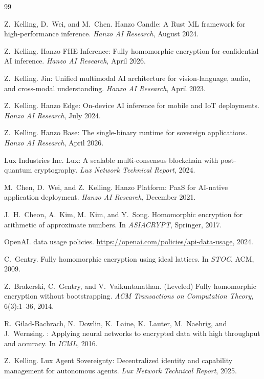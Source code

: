 \begin{thebibliography}{99}

Z.~Kelling, D.~Wei, and M.~Chen.
\newblock Hanzo Candle: A {Rust} {ML} framework for high-performance inference.
\newblock \emph{Hanzo AI Research}, August 2024.

Z.~Kelling.
\newblock Hanzo {FHE} Inference: Fully homomorphic encryption for confidential
{AI} inference.
\newblock \emph{Hanzo AI Research}, April 2026.

Z.~Kelling.
\newblock Jin: Unified multimodal {AI} architecture for vision-language, audio,
and cross-modal understanding.
\newblock \emph{Hanzo AI Research}, April 2023.

Z.~Kelling.
\newblock Hanzo Edge: On-device {AI} inference for mobile and {IoT} deployments.
\newblock \emph{Hanzo AI Research}, July 2024.

Z.~Kelling.
\newblock Hanzo Base: The single-binary runtime for sovereign applications.
\newblock \emph{Hanzo AI Research}, April 2026.

{Lux Industries Inc}.
\newblock Lux: A scalable multi-consensus blockchain with post-quantum
cryptography.
\newblock \emph{Lux Network Technical Report}, 2024.

M.~Chen, D.~Wei, and Z.~Kelling.
\newblock Hanzo Platform: {PaaS} for {AI}-native application deployment.
\newblock \emph{Hanzo AI Research}, December 2021.

J.~H.~Cheon, A.~Kim, M.~Kim, and Y.~Song.
\newblock Homomorphic encryption for arithmetic of approximate numbers.
\newblock In \emph{ASIACRYPT}, Springer, 2017.

{OpenAI}.
 data usage policies.
\newblock \url{https://openai.com/policies/api-data-usage}, 2024.

C.~Gentry.
\newblock Fully homomorphic encryption using ideal lattices.
\newblock In \emph{STOC}, ACM, 2009.

Z.~Brakerski, C.~Gentry, and V.~Vaikuntanathan.
\newblock ({Leveled}) Fully homomorphic encryption without bootstrapping.
\newblock \emph{ACM Transactions on Computation Theory}, 6(3):1--36, 2014.

R.~Gilad-Bachrach, N.~Dowlin, K.~Laine, K.~Lauter, M.~Naehrig, and
J.~Wernsing.
: Applying neural networks to encrypted data with high
throughput and accuracy.
\newblock In \emph{ICML}, 2016.

Z.~Kelling.
\newblock Lux Agent Sovereignty: Decentralized identity and capability
management for autonomous agents.
\newblock \emph{Lux Network Technical Report}, 2025.

\end{thebibliography}

